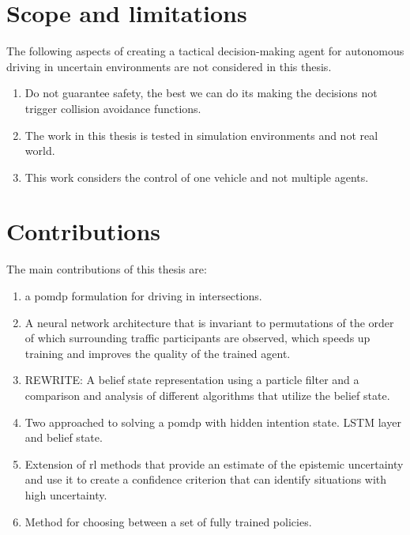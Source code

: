 \section{Scope and limitations}
\label{sec:scope}
The following aspects of creating a tactical decision-making agent for autonomous driving in uncertain environments are not considered in this thesis. 

\begin{enumerate}
	\item Do not guarantee safety, the best we can do its making the decisions not trigger collision avoidance functions. 
	\item The work in this thesis is tested in simulation environments and not real world. 
	\item This work considers the control of one vehicle and not multiple agents. 
	
	
\end{enumerate}


\section{Contributions}
\label{sec:contributions}
The main contributions of this thesis are:
\begin{enumerate}
	\item a \gls{pomdp} formulation for driving in intersections. 
	\item A neural network architecture that is invariant to permutations of the order of which surrounding traffic participants are observed, which speeds up training and improves the quality of the trained agent. 
	\item REWRITE: A belief state representation using a particle filter and a comparison and analysis of different algorithms that utilize the belief state. 
	\item Two approached to solving a \gls{pomdp} with hidden intention state. LSTM layer and belief state. 
	\item Extension of \gls{rl} methods that provide an estimate of the epistemic uncertainty and use it to create a confidence criterion that can identify situations with high uncertainty. 
	\item Method for choosing between a set of fully trained policies. 

\end{enumerate}


